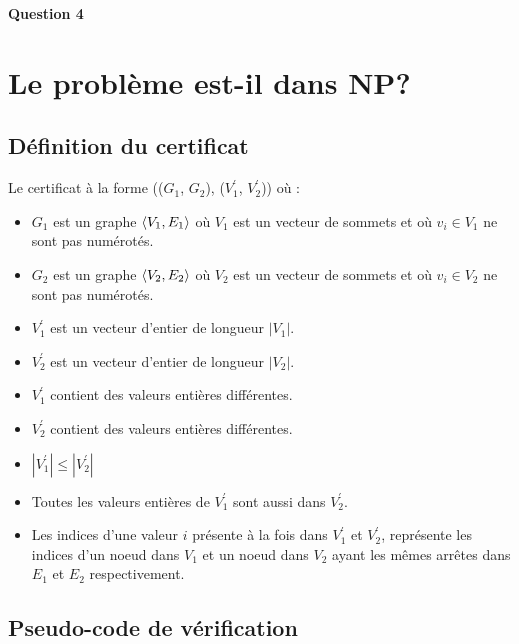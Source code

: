 \documentclass[class=article]{standalone}
\begin{document}
\centerline{\Huge \bf Question 4}
\bigskip

\section*{Le problème est-il dans NP?}
\subsection*{Définition du certificat}

Le certificat à la forme (($G_1$, $G_2$), ($V^\prime_1$, $V^\prime_2$)) où :
\begin{itemize}
  \item $G_1$ est un graphe $\left \langle V_1, E_1 \right \rangle$ où $V_1$ est un vecteur de sommets et où $v_i \in V_1$ ne sont pas numérotés.
  \item $G_2$ est un graphe $\left \langle V_2, E_2 \right \rangle$ où $V_2$ est un vecteur de sommets et où $v_i \in V_2$ ne sont pas numérotés.
  \item $V^\prime_1$ est un vecteur d'entier de longueur $|V_1|$.
  \item $V^\prime_2$ est un vecteur d'entier de longueur $|V_2|$.
  \item $V^\prime_1$ contient des valeurs entières différentes.
  \item $V^\prime_2$ contient des valeurs entières différentes.
  \item $|V^\prime_1| \leq |V^\prime_2|$
  \item Toutes les valeurs entières de $V^\prime_1$ sont aussi dans $V^\prime_2$.
  \item Les indices d'une valeur $i$ présente à la fois dans $V^\prime_1$ et $V^\prime_2$, 
        représente les indices d'un noeud dans $V_1$ et un noeud dans $V_2$
        ayant les mêmes arrêtes dans $E_1$ et $E_2$ respectivement.
\end{itemize}

\subsection*{Pseudo-code de vérification}
\end{document}

